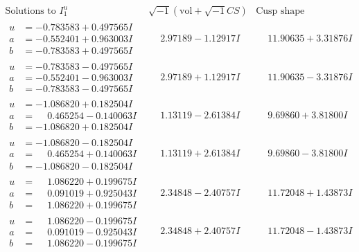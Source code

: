 \documentclass[1p]{elsarticle_modified}
\theoremstyle{definition}
\newcommand{\I}{\sqrt{-1}}
\begin{document}
$$\begin{array}{c|c|c}  
\text{Solutions to }I^u_{1}& \I (\text{vol} + \sqrt{-1}CS) & \text{Cusp shape}\\
 \hline 
\begin{aligned}
u &= -0.783583 + 0.497565 I \\
a &= -0.552401 + 0.963003 I \\
b &= -0.783583 + 0.497565 I\end{aligned}
 & \phantom{-}2.97189 - 1.12917 I & \phantom{-}11.90635 + 3.31876 I \\ \hline\begin{aligned}
u &= -0.783583 - 0.497565 I \\
a &= -0.552401 - 0.963003 I \\
b &= -0.783583 - 0.497565 I\end{aligned}
 & \phantom{-}2.97189 + 1.12917 I & \phantom{-}11.90635 - 3.31876 I \\ \hline\begin{aligned}
u &= -1.086820 + 0.182504 I \\
a &= \phantom{-}0.465254 - 0.140063 I \\
b &= -1.086820 + 0.182504 I\end{aligned}
 & \phantom{-}1.13119 - 2.61384 I & \phantom{-}9.69860 + 3.81800 I \\ \hline\begin{aligned}
u &= -1.086820 - 0.182504 I \\
a &= \phantom{-}0.465254 + 0.140063 I \\
b &= -1.086820 - 0.182504 I\end{aligned}
 & \phantom{-}1.13119 + 2.61384 I & \phantom{-}9.69860 - 3.81800 I \\ \hline\begin{aligned}
u &= \phantom{-}1.086220 + 0.199675 I \\
a &= \phantom{-}0.091019 + 0.925043 I \\
b &= \phantom{-}1.086220 + 0.199675 I\end{aligned}
 & \phantom{-}2.34848 - 2.40757 I & \phantom{-}11.72048 + 1.43873 I \\ \hline\begin{aligned}
u &= \phantom{-}1.086220 - 0.199675 I \\
a &= \phantom{-}0.091019 - 0.925043 I \\
b &= \phantom{-}1.086220 - 0.199675 I\end{aligned}
 & \phantom{-}2.34848 + 2.40757 I & \phantom{-}11.72048 - 1.43873 I \\ \hline\begin{aligned}

\end{aligned}
\end{array}$$
\end{document}
